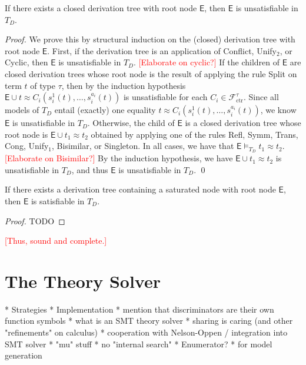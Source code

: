 \documentclass[a4paper,oribibl,envcountsame,draft]{llncs}
\newcommand{\Ec}{\mathsf{E}}
\newcommand{\rn}[1]{\textsf{\small #1}}
\newcommand{\teq}{\approx}
\newcommand{\rem}[1]{\textcolor{red}{[#1]}}
\newcommand{\thD}{T_{D}}
\newcommand\Funcs{\mathcal{F}}
\newcommand\Ctr{\Funcs_{\mathrm{ctr}}}
\begin{document}
\begin{lemma}
If there exists a closed derivation tree with root node $\Ec$, then $\Ec$ is unsatisfiable in $\thD$.
\end{lemma}
\begin{proof}
We prove this by structural induction on the (closed) derivation tree with root node $\Ec$.
First, if the derivation tree is an application of \rn{Conflict}, \rn{Unify$_2$}, or \rn{Cyclic},
then $\Ec$ is unsatisfiable in $\thD$.
\rem{Elaborate on cyclic?}
If the children of $\Ec$ are closed derivation trees 
whose root node is the result of applying the rule \rn{Split} on term $t$ of type $\tau$,
then by the induction hypothesis $\Ec \cup t \teq C_i( s^1_i( t ), \ldots, s^{a_i}_i( t ) )$ is unsatisfiable
for each $C_i \in \Ctr^\tau$.
Since all models of $\thD$ entail (exactly) one equality $t \teq C_i( s^1_i( t ), \ldots, s^{a_i}_i( t ) )$,
we know $\Ec$ is unsatisfiable in $\thD$.
Otherwise, the child of $\Ec$ is a closed derivation tree 
whose root node is $\Ec \cup t_1 \teq t_2$ obtained by applying one of the rules \rn{Refl}, \rn{Symm}, \rn{Trans}, \rn{Cong}, \rn{Unify$_1$}, \rn{Bisimilar}, or \rn{Singleton}.
In all cases, we have that $\Ec \models_{\thD} t_1 \teq t_2$.
\rem{Elaborate on Bisimilar?}
By the induction hypothesis, we have $\Ec \cup t_1 \teq t_2$ is unsatisfiable in $\thD$, 
and thus $\Ec$ is unsatisfiable in $\thD$.
\qed
\end{proof}

\begin{lemma}
If there exists a derivation tree containing a saturated node with root node $\Ec$, then $\Ec$ is satisfiable in $\thD$.
\end{lemma}
\begin{proof}
TODO
\end{proof}

\rem{Thus, sound and complete.}
  
\section{The Theory Solver}
\label{sec:the-theory-solver}

  * Strategies
  * Implementation
    * mention that discriminators are their own function symbols
    * what is an SMT theory solver
    * sharing is caring (and other "refinements" on calculus)
    * cooperation with Nelson-Oppen / integration into SMT solver
    * "mu" stuff
    * no "internal search"
  * Enumerator?
    * for model generation
\end{document}
